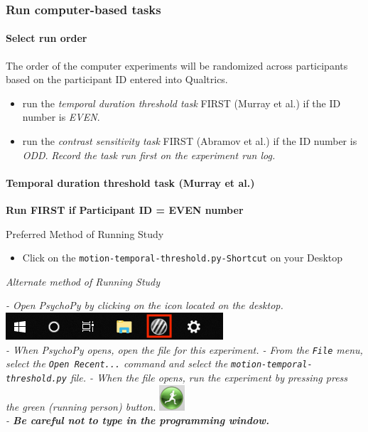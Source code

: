 \documentclass[]{article}
\providecommand{\tightlist}{%
  \setlength{\itemsep}{0pt}\setlength{\parskip}{0pt}}
\let\oldparagraph\paragraph
\renewcommand{\paragraph}[1]{\oldparagraph{#1}\mbox{}}
\begin{document}
\hypertarget{run-computer-based-tasks}{%
\subsubsection{Run computer-based
tasks}\label{run-computer-based-tasks}}

\hypertarget{select-run-order}{%
\paragraph{Select run order}\label{select-run-order}}

The order of the computer experiments will be randomized across
participants based on the participant ID entered into Qualtrics.

\begin{itemize}
\tightlist
\item
  run the \emph{temporal duration threshold task} FIRST (Murray et al.)
  if the ID number is \emph{EVEN}.
\item
  run the \emph{contrast sensitivity task} FIRST (Abramov et al.) if the
  ID number is \emph{ODD}. \emph{Record the task run first on the
  experiment run log.}
\end{itemize}

\hypertarget{temporal-duration-threshold-task-murray-et-al.}{%
\paragraph{Temporal duration threshold task (Murray et
al.)}\label{temporal-duration-threshold-task-murray-et-al.}}

\textbf{Run FIRST if Participant ID = EVEN number}

Preferred Method of Running Study

\begin{itemize}
\tightlist
\item
  Click on the \texttt{motion-temporal-threshold.py-Shortcut} on your
  Desktop
\end{itemize}

\emph{Alternate method of Running Study}

\emph{- Open PsychoPy by clicking on the icon located on the desktop.
\includegraphics{images/PsychoPy-1.PNG}\\
- When PsychoPy opens, open the file for this experiment. - From the
\texttt{File} menu, select the \texttt{Open\ Recent...} command and
select the \texttt{motion-temporal-threshold.py} file. - When the file
opens, run the experiment by pressing press the green (running person)
button. \includegraphics{images/PPrunningMan.png}\\
- \textbf{Be careful not to type in the programming window.}}
\end{document}
